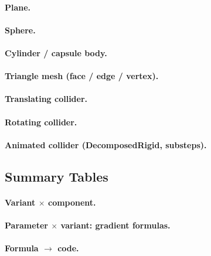 \paragraph{Plane.} \TODO{}
\paragraph{Sphere.} \TODO{}
\paragraph{Cylinder / capsule body.} \TODO{}
\paragraph{Triangle mesh (face / edge / vertex).} \TODO{}
\paragraph{Translating collider.} \TODO{}
\paragraph{Rotating collider.} \TODO{}
\paragraph{Animated collider (DecomposedRigid, substeps).} \TODO{}

\subsection{Summary Tables}
\label{sec:npd_summary}

\paragraph{Variant $\times$ component.} \TODO{}
\paragraph{Parameter $\times$ variant: gradient formulas.} \TODO{}
\paragraph{Formula $\to$ code.} 

